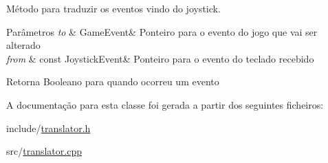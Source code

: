 Método para traduzir os eventos vindo do joystick. 


\begin{DoxyParams}{Parâmetros}
{\em to} & Game\+Event\& Ponteiro para o evento do jogo que vai ser alterado \\
\hline
{\em from} & const Joystick\+Event\& Ponteiro para o evento do teclado recebido \\
\hline
\end{DoxyParams}
\begin{DoxyReturn}{Retorna}
Booleano para quando ocorreu um evento 
\end{DoxyReturn}


A documentação para esta classe foi gerada a partir dos seguintes ficheiros\+:\begin{DoxyCompactItemize}
\item 
include/\mbox{\hyperlink{translator_8h}{translator.\+h}}\item 
src/\mbox{\hyperlink{translator_8cpp}{translator.\+cpp}}\end{DoxyCompactItemize}
